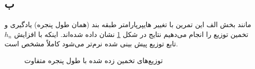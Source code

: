 \documentclass[12pt,onecolumn,a4paper]{article}
\begin{document}
\subsection*{ب}
مانند بخش الف این تمرین با تغییر هایپرپارامتر طبقه بند (همان طول پنجره) یادگیری و تخمین توزیع را انجام می‌دهیم نتایج در شکل \ref{fig:6} نشان داده شده‌اند. اینکه با افزایش  $h_{n}$  تابع توزیع پیش بینی شده نرم‌تر می‌شود کاملاً مشخص است.
\begin{figure}[h]
    \centering
    \caption{توزیع‌های تخمین زده شده با طول پنجره متفاوت}
    \label{fig:6}
\end{figure}
\end{document}
